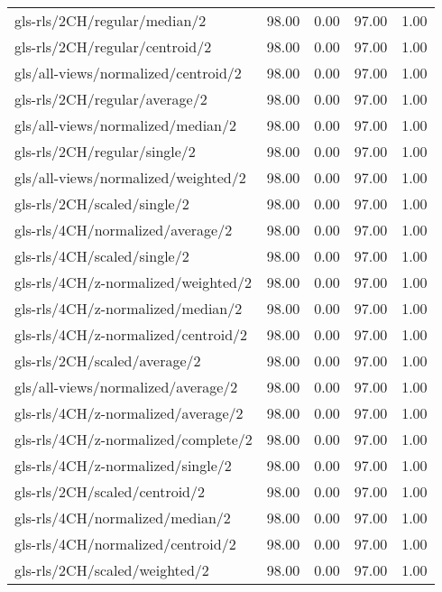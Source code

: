 \begin{longtable}{lrrrr}
    gls-rls/2CH/regular/median/2              & 98.00 &  0.00 & 97.00 &  1.00 \\
    gls-rls/2CH/regular/centroid/2            & 98.00 &  0.00 & 97.00 &  1.00 \\
    gls/all-views/normalized/centroid/2       & 98.00 &  0.00 & 97.00 &  1.00 \\
    gls-rls/2CH/regular/average/2             & 98.00 &  0.00 & 97.00 &  1.00 \\
    gls/all-views/normalized/median/2         & 98.00 &  0.00 & 97.00 &  1.00 \\
    gls-rls/2CH/regular/single/2              & 98.00 &  0.00 & 97.00 &  1.00 \\
    gls/all-views/normalized/weighted/2       & 98.00 &  0.00 & 97.00 &  1.00 \\
    gls-rls/2CH/scaled/single/2               & 98.00 &  0.00 & 97.00 &  1.00 \\
    gls-rls/4CH/normalized/average/2          & 98.00 &  0.00 & 97.00 &  1.00 \\
    gls-rls/4CH/scaled/single/2               & 98.00 &  0.00 & 97.00 &  1.00 \\
    gls-rls/4CH/z-normalized/weighted/2       & 98.00 &  0.00 & 97.00 &  1.00 \\
    gls-rls/4CH/z-normalized/median/2         & 98.00 &  0.00 & 97.00 &  1.00 \\
    gls-rls/4CH/z-normalized/centroid/2       & 98.00 &  0.00 & 97.00 &  1.00 \\
    gls-rls/2CH/scaled/average/2              & 98.00 &  0.00 & 97.00 &  1.00 \\
    gls/all-views/normalized/average/2        & 98.00 &  0.00 & 97.00 &  1.00 \\
    gls-rls/4CH/z-normalized/average/2        & 98.00 &  0.00 & 97.00 &  1.00 \\
    gls-rls/4CH/z-normalized/complete/2       & 98.00 &  0.00 & 97.00 &  1.00 \\
    gls-rls/4CH/z-normalized/single/2         & 98.00 &  0.00 & 97.00 &  1.00 \\
    gls-rls/2CH/scaled/centroid/2             & 98.00 &  0.00 & 97.00 &  1.00 \\
    gls-rls/4CH/normalized/median/2           & 98.00 &  0.00 & 97.00 &  1.00 \\
    gls-rls/4CH/normalized/centroid/2         & 98.00 &  0.00 & 97.00 &  1.00 \\
    gls-rls/2CH/scaled/weighted/2             & 98.00 &  0.00 & 97.00 &  1.00 \\

\end{longtable}
